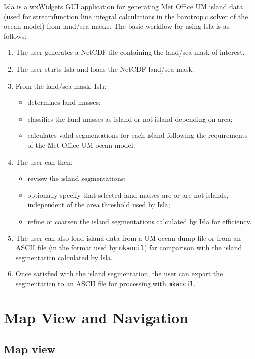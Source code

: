 \documentclass[11pt,makeidx,texhelp]{report}
\begin{document}
Isla is a wxWidgets GUI application for generating Met Office UM
island data (used for streamfunction line integral calculations in the
barotropic solver of the ocean model) from land/sea masks.  The basic
workflow for using Isla is as follows:
\begin{enumerate}
  \item{The user generates a NetCDF file containing the land/sea mask
    of interest.}
  \item{The user starts Isla and loads the NetCDF land/sea mask.}
  \item{From the land/sea mask, Isla:
    \begin{itemize}
      \item{determines land masses;}
      \item{classifies the land masses as island or not island
        depending on area;}
      \item{calculates valid segmentations for each island following
        the requirements of the Met Office UM ocean model.}
    \end{itemize}}
  \item{The user can then:
    \begin{itemize}
      \item{review the island segmentations;}
      \item{optionally specify that selected land masses are or are
        not islands, independent of the area threshold used by Isla;}
      \item{refine or coarsen the island segmentations calculated by
        Isla for efficiency.}
    \end{itemize}}
  \item{The user can also load island data from a UM ocean dump file
    or from an ASCII file (in the format used by \texttt{mkancil}) for
    comparison with the island segmentation calculated by Isla.}
  \item{Once satisfied with the island segmentation, the user can
    export the segmentation to an ASCII file for processing with
    \texttt{mkancil}.}
\end{enumerate}


\chapter{Map View and Navigation}

\section{Map view}
\end{document}
